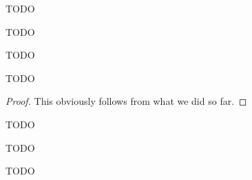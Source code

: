%


\begin{definition}
  \label{def:LegendreSymbol.χ}
  \leanok
  TODO
\end{definition}

\begin{definition}
  \label{def:Elligator1.c}
  \leanok
  TODO
\end{definition}

\begin{theorem}[c Property]
  \label{thm:Elligator1.c_h}
  \leanok
  TODO
\end{theorem}

\begin{theorem}[c defined]
  \label{thm:Elligator1.c_defined}
  TODO
\end{theorem}

\begin{proof}
  \leanok
  This obviously follows from what we did so far.
\end{proof}

\begin{definition}
  \label{def:Elligator1.r}
  \leanok
  TODO
\end{definition}

\begin{theorem}[r nonzero]
  \label{thm:Elligator1.r_ne_zero}
  \leanok
  TODO
\end{theorem}

\begin{definition}
  \label{def:Elligator1.d}
  \leanok
  TODO
\end{definition}

